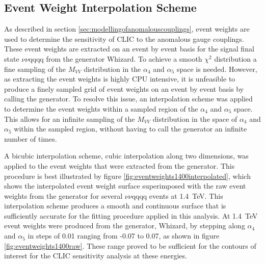 
\subsection{Event Weight Interpolation Scheme}
\label{sec:eventweightsinterpolation}
As described in section \ref{sec:modellingofanomalouscouplings}, event weights are used to determine the sensitivity of CLIC to the anomalous gauge couplings.  These event weights are extracted on an event by event basis for the signal final state $\nu\nu\text{qqqq}$ from the generator Whizard.  To achieve a smooth $\chi^{2}$ distribution a fine sampling of the $M_{VV}$ distribution in the $\alpha_{4}$ and $\alpha_{5}$ space is needed.  However, as extracting the event weights is highly CPU intensive, it is unfeasible to produce a finely sampled grid of event weights on an event by event basis by calling the generator.  To resolve this issue, an interpolation scheme was applied to determine the event weights within a sampled region of the $\alpha_{4}$ and $\alpha_{5}$ space.  This allows for an infinite sampling of the $M_{VV}$ distribution in the space of $\alpha_{4}$ and $\alpha_{5}$ within the sampled region, without having to call the generator an infinite number of times.

A bicubic interpolation scheme, cubic interpolation along two dimensions, was applied to the event weights that were extracted from the generator.  This procedure is best illustrated by figure \ref{fig:eventweights1400interpolated}, which shows the interpolated event weight surface superimposed with the raw event weights from the generator for several $\nu\nu\text{qqqq}$ events at 1.4~TeV.  This interpolation scheme produces a smooth and continuous surface that is sufficiently accurate for the fitting procedure applied in this analysis.  At 1.4~TeV event weights were produced from the generator, Whizard, by stepping along $\alpha_{4}$ and $\alpha_{5}$ in steps of 0.01 ranging from -0.07 to 0.07, as shown in figure \ref{fig:eventweights1400raw}.  These range proved to be sufficient for the contours of interest for the CLIC sensitivity analysis at these energies.

